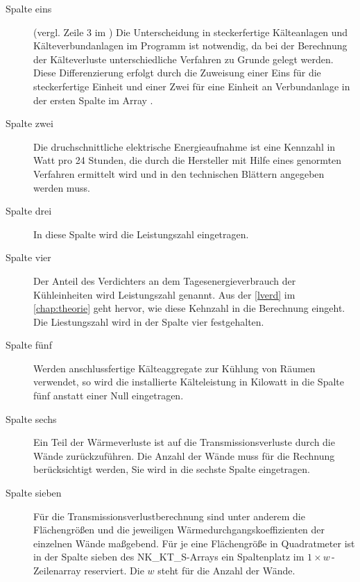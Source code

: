 \begin{description}

	\item [{Spalte eins}] (vergl. Zeile 3 im ) Die Unterscheidung in steckerfertige
	Kälteanlagen und Kälteverbundanlagen im Programm ist notwendig, da bei
	der Berechnung der Kälteverluste unterschiedliche Verfahren zu Grunde
	gelegt werden. Diese Differenzierung erfolgt durch die Zuweisung einer
	Eins für die steckerfertige Einheit und einer Zwei für eine Einheit an
	Verbundanlage in der ersten Spalte im Array .

	\item [{Spalte zwei}] Die druchschnittliche elektrische Energieaufnahme
	ist eine Kennzahl in Watt pro 24 Stunden, die durch die Hersteller mit
	Hilfe eines genormten Verfahren ermittelt wird und in den technischen
	Blättern angegeben werden muss.

	\item [{Spalte drei}] In diese Spalte wird die Leistungszahl
	eingetragen.

	\item [{Spalte vier}] Der Anteil des Verdichters an dem
	Tagesenergieverbrauch der Kühleinheiten wird Leistungszahl genannt. Aus
	der \cref{lverd} im \cref{chap:theorie} geht hervor, wie diese Kehnzahl
	in die Berechnung eingeht. Die Liestungszahl wird in der Spalte vier
	festgehalten.

	\item [{Spalte fünf}] Werden anschlussfertige Kälteaggregate zur Kühlung
	von Räumen verwendet, so wird die installierte Kälteleistung in Kilowatt
	in die Spalte fünf anstatt einer Null eingetragen.

	\item [{Spalte sechs}] Ein Teil der Wärmeverluste ist auf die
	Transmissionsverluste durch die Wände zurückzuführen.  Die Anzahl der
	Wände muss für die Rechnung berücksichtigt werden, Sie wird in die
	sechste Spalte eingetragen.
	
	\item [{Spalte sieben}] Für die Transmissionsverlustberechnung sind
	unter anderem die Flächengrößen und die jeweiligen
	Wärmedurchgangskoeffizienten der einzelnen Wände
	maßgebend. Für je
	eine Flächengröße in Quadratmeter ist in der Spalte sieben des
	NK\_KT\_S-Arrays ein Spaltenplatz im $1\times w\,$-Zeilenarray
	reserviert. Die $w$ steht für die Anzahl der Wände.


\end{description}
